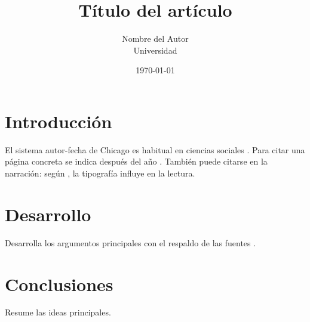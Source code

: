 \documentclass[12pt,a4paper]{article}
\title{Título del artículo}
\author{Nombre del Autor\\\small Universidad}
\date{\today}
\begin{document}
\maketitle

\section{Introducción}
El sistema autor-fecha de Chicago es habitual en ciencias sociales
\autocite{chicago2017}. Para citar una página concreta se indica después del año
\autocite[45]{lamport1994}. También puede citarse en la narración: según
\textcite{knuth1984}, la tipografía influye en la lectura.

\section{Desarrollo}
Desarrolla los argumentos principales con el respaldo de las fuentes
\autocite{goossens2004}.

\section{Conclusiones}
Resume las ideas principales.

\printbibliography[title=Referencias]
\end{document}
